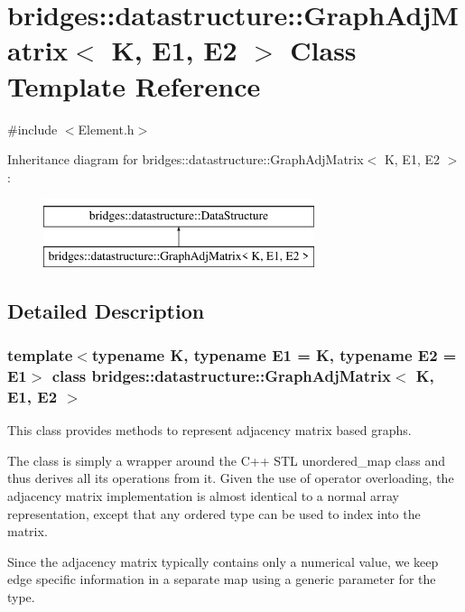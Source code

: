 \hypertarget{classbridges_1_1datastructure_1_1_graph_adj_matrix}{}\section{bridges\+:\+:datastructure\+:\+:Graph\+Adj\+Matrix$<$ K, E1, E2 $>$ Class Template Reference}
\label{classbridges_1_1datastructure_1_1_graph_adj_matrix}


{\ttfamily \#include $<$Element.\+h$>$}

Inheritance diagram for bridges\+:\+:datastructure\+:\+:Graph\+Adj\+Matrix$<$ K, E1, E2 $>$\+:\begin{figure}[H]
\begin{center}
\leavevmode
\includegraphics[height=2.000000cm]{classbridges_1_1datastructure_1_1_graph_adj_matrix}
\end{center}
\end{figure}


\subsection{Detailed Description}
\subsubsection*{template$<$typename K, typename E1 = K, typename E2 = E1$>$\newline
class bridges\+::datastructure\+::\+Graph\+Adj\+Matrix$<$ K, E1, E2 $>$}

This class provides methods to represent adjacency matrix based graphs. 

The class is simply a wrapper around the C++ S\+TL unordered\+\_\+map class and thus derives all its operations from it. Given the use of operator overloading, the adjacency matrix implementation is almost identical to a normal array representation, except that any ordered type can be used to index into the matrix.

Since the adjacency matrix typically contains only a numerical value, we keep edge specific information in a separate map using a generic parameter for the type.

